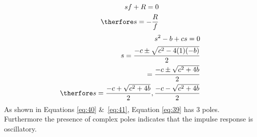 \begin{align}
    sf+R = 0 \nonumber \\
    \therfore s = -\frac{R}{f} \label{eq:40}
\end{align}
\begin{align}
    s^2 - b + cs = 0 \nonumber \\
    s = \frac{-c \pm \sqrt{c^2 - 4(1)(-b)}}{2} \nonumber \\
    = \frac{-c \pm \sqrt{c^2 + 4b}}{2} \nonumber \\
    \therfore s = \frac{-c + \sqrt{c^2 + 4b}}{2} ,\frac{-c - \sqrt{c^2 + 4b}}{2} \label{eq:41}   
\end{align}
As shown in Equations \eqref{eq:40} \&\ \eqref{eq:41}, Equation \eqref{eq:39} has 3 poles. Furthermore the presence of complex poles indicates that the impulse response is oscillatory.
\pagebreak